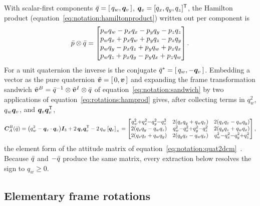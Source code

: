 With scalar-first components $\bar{q} = [\,q_w, \bm{q}_v\,]$,
$\bm{q}_v = [q_x, q_y, q_z]^{\mathsf T}$, the Hamilton product
(equation~\eqref{eq:notation:hamiltonproduct}) written out per component is
\begin{equation}
  \bar{p} \otimes \bar{q} =
  \begin{bmatrix}
    p_w q_w - p_x q_x - p_y q_y - p_z q_z \\
    p_w q_x + p_x q_w + p_y q_z - p_z q_y \\
    p_w q_y - p_x q_z + p_y q_w + p_z q_x \\
    p_w q_z + p_x q_y - p_y q_x + p_z q_w
  \end{bmatrix}.
  \label{eq:rotations:hamprod}
\end{equation}
For a unit quaternion the inverse is the conjugate
$\bar{q}^{*} = [\,q_w, -\bm{q}_v\,]$. Embedding a vector as the pure
quaternion $\tilde{\bm{v}} = [\,0, \bm{v}\,]$ and expanding the frame
transformation sandwich $\tilde{\bm{v}}^{B} = \bar{q}^{-1} \otimes
\tilde{\bm{v}}^{I} \otimes \bar{q}$ of
equation~\eqref{eq:notation:sandwich} by two applications of
equation~\eqref{eq:rotations:hamprod} gives, after collecting terms in
$q_w^2$, $q_w \bm{q}_v$, and $\bm{q}_v \bm{q}_v^{\mathsf T}$,
\begin{equation}
  \bm{C}_{A}^{B}(\bar{q})
  = \bigl(q_w^{2} - \bm{q}_v \cdot \bm{q}_v\bigr) \bm{I}_3
    + 2\, \bm{q}_v \bm{q}_v^{\mathsf T}
    - 2\, q_w \left[\bm{q}_v\right]_{\times}
  =
  \begin{bmatrix}
    q_w^2{+}q_x^2{-}q_y^2{-}q_z^2 & 2(q_x q_y + q_w q_z) & 2(q_x q_z - q_w q_y) \\
    2(q_x q_y - q_w q_z) & q_w^2{-}q_x^2{+}q_y^2{-}q_z^2 & 2(q_y q_z + q_w q_x) \\
    2(q_x q_z + q_w q_y) & 2(q_y q_z - q_w q_x) & q_w^2{-}q_x^2{-}q_y^2{+}q_z^2
  \end{bmatrix},
  \label{eq:rotations:quat2dcm}
\end{equation}
the element form of the attitude matrix of
equation~\eqref{eq:notation:quat2dcm}~\cite{markley2014}. Because
$\bar{q}$ and $-\bar{q}$ produce the same matrix, every extraction below
resolves the sign to $q_w \geq 0$.

\subsection{Elementary frame rotations}

